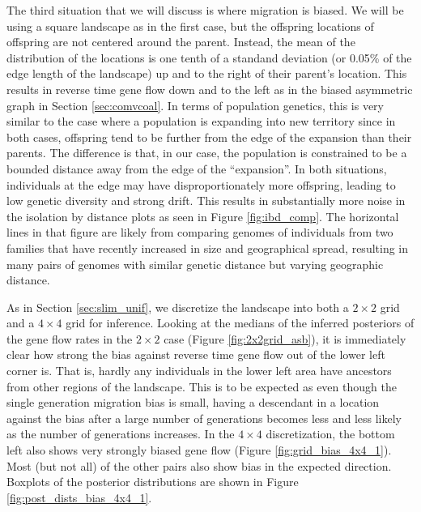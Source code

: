 \documentclass{article}
\begin{document}
The third situation that we will discuss is where migration is biased.
We will be using a square landscape as in the first case, 
but the offspring locations of offspring are not centered around the parent.
Instead, the mean of the distribution of the locations
is one tenth of a standand deviation (or 0.05\% of the edge length of the landscape) 
up and to the right of their parent's location.
This results in reverse time gene flow down and to the left 
as in the biased asymmetric graph in Section \ref{sec:comvcoal}.
In terms of population genetics, 
this is very similar to the case where a population is expanding into new territory 
since in both cases, 
offspring tend to be further from the edge of the expansion than their parents.
The difference is that, in our case, 
the population is constrained to be a bounded distance 
away from the edge of the ``expansion''.
In both situations, individuals at the edge may have disproportionately more offspring,
leading to low genetic diversity and strong drift.
This results in substantially more noise in the isolation by distance plots 
as seen in Figure \ref{fig:ibd_comp}. 
The horizontal lines in that figure are likely from comparing genomes of individuals from
two families that have recently increased in size and geographical spread, 
resulting in many pairs of genomes with similar genetic distance 
but varying geographic distance.

As in Section \ref{sec:slim_unif}, we discretize the landscape into
both a $2 \times 2$ grid and a $4 \times 4$ grid for inference.
Looking at the medians of the inferred posteriors of the gene flow rates in the $2 \times 2$ case
(Figure \ref{fig:2x2grid_asb}),
it is immediately clear how strong the bias 
against reverse time gene flow out of the lower left corner is.
That is, hardly any individuals in the lower left area have ancestors
from other regions of the landscape.
This is to be expected as even though the single generation migration bias is small,
having a descendant in a location against the bias after a large number of generations
becomes less and less likely as the number of generations increases.
In the $4 \times 4$ discretization, 
the bottom left also shows very strongly biased gene flow (Figure \ref{fig:grid_bias_4x4_1}).
Most (but not all) of the other pairs also show bias in the expected direction.
Boxplots of the posterior distributions are shown in Figure \ref{fig:post_dists_bias_4x4_1}.

\end{document}
